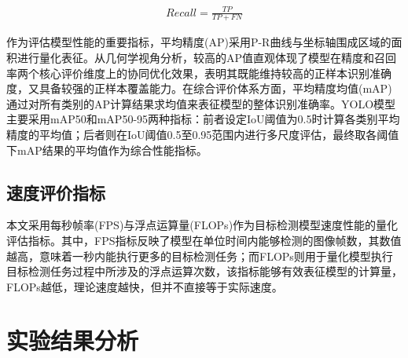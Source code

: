 \begin{equation}
    \begin{aligned}
    Recall = \frac{TP}{TP + FN}\label{eq:recall}
    \end{aligned}
\end{equation}

作为评估模型性能的重要指标，平均精度(AP)采用P-R曲线与坐标轴围成区域的面积进行量化表征。从几何学视角分析，较高的AP值直观体现了模型在精度和召回率两个核心评价维度上的协同优化效果，表明其既能维持较高的正样本识别准确度，又具备较强的正样本覆盖能力。在综合评价体系方面，平均精度均值(mAP)通过对所有类别的AP计算结果求均值来表征模型的整体识别准确率。YOLO模型主要采用mAP50和mAP50-95两种指标：前者设定IoU阈值为0.5时计算各类别平均精度的平均值；后者则在IoU阈值0.5至0.95范围内进行多尺度评估，最终取各阈值下mAP结果的平均值作为综合性能指标。


\subsection{速度评价指标}
本文采用每秒帧率(FPS)与浮点运算量(FLOPs)作为目标检测模型速度性能的量化评估指标。其中，FPS指标反映了模型在单位时间内能够检测的图像帧数，其数值越高，意味着一秒内能执行更多的目标检测任务；而FLOPs则用于量化模型执行目标检测任务过程中所涉及的浮点运算次数，该指标能够有效表征模型的计算量，FLOPs越低，理论速度越快，但并不直接等于实际速度。

\section{实验结果分析}
